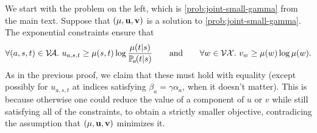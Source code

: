 \begin{lproof}\label{proof:joint-small-gamma-correct}
    We start with the problem on the left, which is \eqref{prob:joint-small-gamma} from the main text.
    Suppose that $(\mu, \mathbf{u}, \mathbf{v})$ is a solution to \eqref{prob:joint-small-gamma}.
    The exponential constraints ensure that
    \[
        \forall (a,s,t) \in \V\!\Ar.~
        u_{a,s,t} \ge \mu(s,t) \log \frac{\mu(t|s)}{\p_a(t|s)}
    \qquad\text{and}\qquad
        \forall w \in \V \X.~
        v_{w} \ge \mu(w) \log \mu(w).
    \]
    As in the previous proof, we claim that these must hold with equality (except possibly for $u_{a,s,t}$ at indices satisfying $\beta_a = \gamma \alpha_a$, when it doesn't matter). 
    This is because otherwise one could reduce the value of a component of $u$ or $v$ while still satisfying all of the constraints, to obtain a strictly smaller objective, contradicing the assumption that $(\mu, \mathbf{u}, \mathbf{v})$ minimizes it. 
    

\end{lproof}
